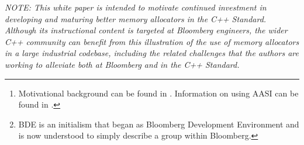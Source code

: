 \emph{NOTE: This white paper is intended to motivate continued investment in
developing and maturing better memory allocators in the C++ Standard. Although
its instructional content is targeted at Bloomberg engineers, the wider C++
community can benefit from this illustration of the use of memory allocators
in a large industrial codebase, including the related challenges that the
authors are working to alleviate both at Bloomberg and in the C++ Standard.}

\begin{abstract}
Allocator-aware (AA) software — software that allows a client to supply an
allocator at object construction — provides the application developer with an
effective, lower-cost alternative to writing bespoke types having individually
customized memory management.\footnote{Motivational background can be found in
\cite{halpern20a}. Information on using AASI can be found in
\cite{halpern20b}.}  Creating AA software, however, can be
considerably more complex than using existing AA software. After introducing
the requirements for an AA type compatible with the BDE\footnote{BDE is an
initialism that began as Bloomberg Development Environment and is now
understood to simply describe a group within Bloomberg.}  Development
Environment, this paper walks the reader through the steps of transforming
a simple struct into an AA class and then explains how to accomplish this
task for increasingly complex categories of types, culminating with container
class templates.

\end{abstract}
